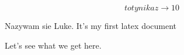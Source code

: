 \documentclass{article}
\begin{document}
$$ to tynika z       \rightarrow{10}$$  

Nazywam sie Luke. It's my first latex document

Let's see what we get here.
\end{document}
